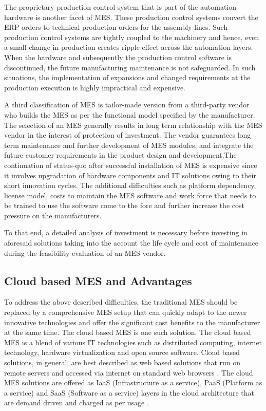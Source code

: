 \documentclass[10pt,conference,compsocconf]{IEEEtran}
\begin{document}
The proprietary production control system that is part of the automation hardware is another facet of MES. These production control systems convert the ERP orders to technical production orders for the assembly lines. Such production control systems are tightly coupled to the machinery and hence, even a small change in production creates ripple effect across the automation layers.  When the hardware and subsequently the production control software is discontinued, the future manufacturing maintenance is not safeguarded. In such situations, the implementation of expansions and changed requirements at the production execution is highly impractical and expensive.

A third classification of MES is tailor-made version from a third-party vendor who builds the MES as per the functional model specified by the manufacturer. The selection of an MES generally results in long term relationship with the MES vendor in the interest of protection of investment. The vendor guarantees long term maintenance and further development of MES modules, and integrate the future customer requirements in the product design and development.The continuation of status-quo after successful installation of MES is expensive since it involves upgradation of hardware components and IT solutions owing to their short innovation cycles. The additional difficulties such as platform dependency, license model, costs to maintain the MES software and work force that needs to be trained to use the software come to the fore and further increase the cost pressure on the manufacturers.

To that end, a detailed analysis of investment is necessary before investing in aforesaid solutions taking into the account the life cycle and cost of maintenance during the feasibility evaluation of an MES vendor.

\subsection{Cloud based MES and Advantages}
To address the above described difficulties, the traditional MES should be replaced by a comprehensive MES setup that can quickly adapt to the newer innovative technologies and offer the significant cost benefits to the manufacturer at the same time. The cloud based MES \cite{Tao_Cheng:2014:CCIoT-CMfg} is one such solution. The cloud based MES is a blend of various IT technologies such as distributed computing, internet technology, hardware virtualization and open source software. Cloud based solutions, in general, are best described as web based solutions that run on remote servers and accessed via internet on standard web browsers \cite{Lenart:2011:ERP_in}. The cloud MES solutions are offered as IaaS (Infrastructure as a service), PaaS (Platform as a service) and SaaS (Software as a service) layers in the cloud architecture that are demand driven and charged as per usage \cite{Hwang_Chuang:2011:A_Business}. 
\end{document}
